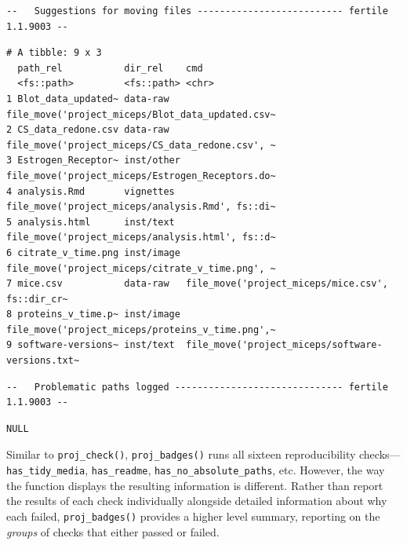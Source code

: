 \documentclass[12pt,twoside]{reedthesis}
\begin{document}
\begin{verbatim}
--   Suggestions for moving files -------------------------- fertile 1.1.9003 --
\end{verbatim}
\begin{verbatim}
# A tibble: 9 x 3
  path_rel           dir_rel    cmd                                             
  <fs::path>         <fs::path> <chr>                                           
1 Blot_data_updated~ data-raw   file_move('project_miceps/Blot_data_updated.csv~
2 CS_data_redone.csv data-raw   file_move('project_miceps/CS_data_redone.csv', ~
3 Estrogen_Receptor~ inst/other file_move('project_miceps/Estrogen_Receptors.do~
4 analysis.Rmd       vignettes  file_move('project_miceps/analysis.Rmd', fs::di~
5 analysis.html      inst/text  file_move('project_miceps/analysis.html', fs::d~
6 citrate_v_time.png inst/image file_move('project_miceps/citrate_v_time.png', ~
7 mice.csv           data-raw   file_move('project_miceps/mice.csv', fs::dir_cr~
8 proteins_v_time.p~ inst/image file_move('project_miceps/proteins_v_time.png',~
9 software-versions~ inst/text  file_move('project_miceps/software-versions.txt~
\end{verbatim}
\begin{verbatim}
--   Problematic paths logged ------------------------------ fertile 1.1.9003 --
\end{verbatim}
\begin{verbatim}
NULL
\end{verbatim}
Similar to \texttt{proj\_check()}, \texttt{proj\_badges()} runs all sixteen reproducibility checks---\texttt{has\_tidy\_media}, \texttt{has\_readme}, \texttt{has\_no\_absolute\_paths}, etc. However, the way the function displays the resulting information is different. Rather than report the results of each check individually alongside detailed information about why each failed, \texttt{proj\_badges()} provides a higher level summary, reporting on the \emph{groups} of checks that either passed or failed.
\end{document}
